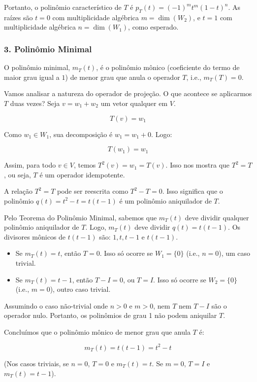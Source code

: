 Portanto, o polinômio característico de $T$ é $p_T(t)=(-1)^m t^m (1-t)^n$.
As raízes são $t=0$ com multiplicidade algébrica $m=\dim(W_2)$, e $t=1$ com multiplicidade
algébrica $n=\dim(W_1)$, como esperado.

\subsubsection*{3. Polinômio Minimal}

O polinômio minimal, $m_T(t)$, é o polinômio mônico (coeficiente do termo de maior grau igual a $1$) de
menor grau que anula o operador $T$, i.e., $m_T(T)=0$.

Vamos analisar a natureza do operador de projeção. O que acontece se aplicarmos $T$ duas vezes?
Seja $v=w_1+w_2$ um vetor qualquer em $V$.

\[
T(v)=w_1
\]

Como $w_1 \in W_1$, sua decomposição é $w_1=w_1+0$. Logo:

\[
T(w_1)=w_1
\]

Assim, para todo $v \in V$, temos $T^2(v)=w_1=T(v)$.
Isso nos mostra que $T^2=T$, ou seja, $T$ é um operador idempotente.

A relação $T^2=T$ pode ser reescrita como $T^2-T=0$. Isso significa que o polinômio $q(t)=t^2-t=t(t-1)$ é um polinômio aniquilador de $T$.

Pelo Teorema do Polinômio Minimal, sabemos que $m_T(t)$ deve dividir qualquer polinômio aniquilador
de $T$. Logo, $m_T(t)$ deve dividir $q(t)=t(t-1)$.
Os divisores mônicos de $t(t-1)$ são: $1, t, t-1$ e $t(t-1)$.

\begin{itemize}
\item Se $m_T(t)=t$, então $T=0$. Isso só ocorre se $W_1=\{0\}$ (i.e., $n=0$), um caso trivial.
\item Se $m_T(t)=t-1$, então $T-I=0$, ou $T=I$. Isso só ocorre se $W_2=\{0\}$ (i.e., $m=0$), outro caso trivial.
\end{itemize}

Assumindo o caso não-trivial onde $n>0$ e $m>0$, nem $T$ nem $T-I$ são o operador nulo.
Portanto, os polinômios de grau 1 não podem aniquilar $T$.

Concluímos que o polinômio mônico de menor grau que anula $T$ é:

\[
m_T(t)=t(t-1)=t^2-t
\]

(Nos casos triviais, se $n=0$, $T=0$ e $m_T(t)=t$. Se $m=0$, $T=I$ e $m_T(t)=t-1$).

